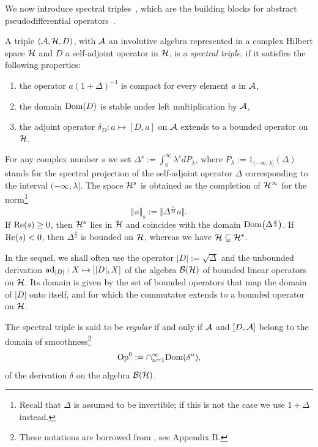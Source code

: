 We now introduce spectral triples~\cite{Co}, which  are the building blocks for abstract pseudodif\/ferential operators~\cite{CoMo,Hig}.

\begin{definition} A triple   $({\cal A}, {\cal H}, D)$, with  ${\cal A}$  an
involutive algebra represented in a complex Hilbert space ${\cal H}$ and $D$ a
self-adjoint operator in ${\cal H}$, is a {\it spectral triple}, if it satisf\/ies the
following properties:{\samepage
\begin{enumerate}
\itemsep=-0.5pt
\item[1)] the operator $a  (1+\Delta)^{-1}$ is compact for every element $a$ in
  ${\cal A}$,
\item[2)] the domain ${\rm Dom}(D)$ is stable under left multiplication by
${\cal A}$,
\item[3)] the adjoint operator $\delta_D: a\mapsto [D, a]$ on ${\cal A}$  extends to a bounded operator on ${\cal H}$.
\end{enumerate}}
\end{definition}

 For any complex number $s$
we set $\Delta^s:= \int_0^\infty
 \lambda^s   dP_\lambda$, where $P_\lambda:= 1_{({-}\infty, \lambda]}(\Delta) $
 stands for the spectral projection
of  the self-adjoint operator $\Delta$ corresponding to the interval $({-}\infty,
\lambda]$. The space ${\cal H}^s$ is obtained as the completion of ${\cal H}^\infty$
 for the norm\footnote{Recall that $\Delta$ is assumed to be invertible; if this
 is not the case we use $1+\Delta$ instead.}
 \[
 \Vert u\Vert_s:=\Vert \Delta^{\frac{s}{2d}} u\Vert.
 \]
  If  ${\rm Re}(s)\geq 0$, then  ${\cal H}^s$ lies in $ {\cal H}$ and coincides with
   the domain $ {\rm
  Dom}\big(\Delta^{\frac{s}{2}}\big)$.   If  ${\rm Re}(s)< 0$, then
  $\Delta^{\frac{s}{2}}$ is bounded on ${\cal H}$, whereas we have
  $  {\cal H} \subsetneq {\cal H}^s$.

  In the sequel, we shall often use the operator $\vert D\vert:= \sqrt{\Delta}$
  and  the unbounded derivation ${\rm ad}_{\vert D\vert}:
  X\mapsto [\vert D\vert, X]$ of the algebra  ${\cal B}({\cal H})$ of bounded
  linear operators on ${\cal H}$. Its
     domain is given by the set of bounded operators  that map the domain of
    $\vert D\vert$  onto itself, and for  which the commutator extends
    to a bounded operator on ${\cal H}$.

\begin{definition}
The spectral triple is said to be {\it regular} if and only if ${\cal A}$ and
$[D, {\cal A}]$ belong to the domain of smoothness\footnote{These notations are borrowed from \cite{CoMo},
  see Appendix B.}
  \[
  {\rm Op}^0:=\cap_{n=1}^\infty  {\rm Dom}(\delta^n),
   \]
   of the derivation $\delta$ on the algebra ${\cal B}({\cal H})$.
 \end{definition}


